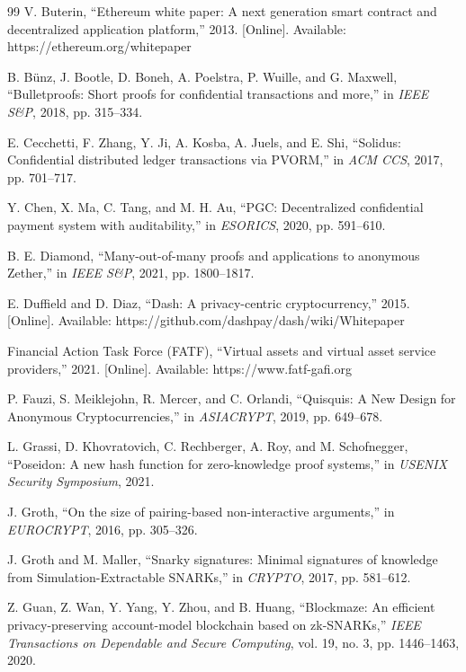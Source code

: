 \documentclass[conference]{IEEEtran}
\begin{document}
\begin{thebibliography}{99}
V. Buterin, ``Ethereum white paper: A next generation smart contract and decentralized application platform,'' 2013. [Online]. Available: https://ethereum.org/whitepaper

B. Bünz, J. Bootle, D. Boneh, A. Poelstra, P. Wuille, and G. Maxwell, ``Bulletproofs: Short proofs for confidential transactions and more,'' in \textit{IEEE S&P}, 2018, pp. 315--334.

E. Cecchetti, F. Zhang, Y. Ji, A. Kosba, A. Juels, and E. Shi, ``Solidus: Confidential distributed ledger transactions via PVORM,'' in \textit{ACM CCS}, 2017, pp. 701--717.

Y. Chen, X. Ma, C. Tang, and M. H. Au, ``PGC: Decentralized confidential payment system with auditability,'' in \textit{ESORICS}, 2020, pp. 591--610.

B. E. Diamond, ``Many-out-of-many proofs and applications to anonymous Zether,'' in \textit{IEEE S&P}, 2021, pp. 1800--1817.

E. Duffield and D. Diaz, ``Dash: A privacy-centric cryptocurrency,'' 2015. [Online]. Available: https://github.com/dashpay/dash/wiki/Whitepaper

Financial Action Task Force (FATF), ``Virtual assets and virtual asset service providers,'' 2021. [Online]. Available: https://www.fatf-gafi.org

P. Fauzi, S. Meiklejohn, R. Mercer, and C. Orlandi, ``Quisquis: A New Design for Anonymous Cryptocurrencies,'' in \textit{ASIACRYPT}, 2019, pp. 649--678.

L. Grassi, D. Khovratovich, C. Rechberger, A. Roy, and M. Schofnegger, ``Poseidon: A new hash function for zero-knowledge proof systems,'' in \textit{USENIX Security Symposium}, 2021.

J. Groth, ``On the size of pairing-based non-interactive arguments,'' in \textit{EUROCRYPT}, 2016, pp. 305--326.

J. Groth and M. Maller, ``Snarky signatures: Minimal signatures of knowledge from Simulation-Extractable SNARKs,'' in \textit{CRYPTO}, 2017, pp. 581--612.

Z. Guan, Z. Wan, Y. Yang, Y. Zhou, and B. Huang, ``Blockmaze: An efficient privacy-preserving account-model blockchain based on zk-SNARKs,'' \textit{IEEE Transactions on Dependable and Secure Computing}, vol. 19, no. 3, pp. 1446--1463, 2020.


\end{thebibliography}
\end{document}
